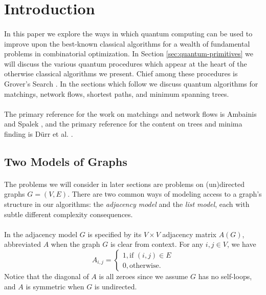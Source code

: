 \section{Introduction}
\paragraph{}
In this paper we explore the ways in which quantum computing can be used to improve upon the best-known classical algorithms for a wealth of fundamental problems in combinatorial optimization. In Section \ref{sec:quantum-primitives} we will discuss the various quantum procedures which appear at the heart of the otherwise classical algorithms we present. Chief among these procedures is Grover's Search \cite{grover1996fast}. In the sections which follow we discuss quantum algorithms for matchings, network flows, shortest paths, and minimum spanning trees.
\paragraph{}
The primary reference for the work on matchings and network flows is Ambainis and Spalek \cite{ambainis2006quantum}, and the primary reference for the content on trees and minima finding is D{\"u}rr et al.  \cite{durr2004quantum}.
\subsection{Two Models of Graphs}
\paragraph{}
The problems we will consider in later sections are problems on (un)directed graphs $G=(V,E)$. There are two common ways of modeling access to a graph's structure in our algorithms: the {\it adjacency model} and the {\it list model}, each with subtle different complexity consequences.
\paragraph{}
In the adjacency model $G$ is specified by its $V \times V$ adjacency matrix $A(G)$, abbreviated $A$ when the graph $G$ is clear from context. For any $i, j \in V$, we have
$$A_{i,j} = \begin{cases}
1, \text{if $(i,j) \in E$}\\
0, \text{otherwise.}
\end{cases}$$
Notice that the diagonal of $A$ is all zeroes since we assume $G$ has no self-loops, and $A$ is symmetric when $G$ is undirected.
